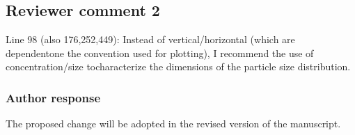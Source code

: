 \documentclass[11pt]{scrartcl}
\providecommand{\DIFadd}[1]{{\protect\textcolor{blue}{\uwave{#1}}}} %
\providecommand{\DIFdel}[1]{{\protect\textcolor{red}{\sout{#1}}}}                      %
\providecommand{\DIFaddbegin}{} %
\providecommand{\DIFaddend}{} %
\providecommand{\DIFdelbegin}{} %
\providecommand{\DIFdelend}{} %
\newenvironment{change}[1][]{%
  \begin{mdframed}[frametitle={Line #1:}]%
}{%
  \end{mdframed}%
}
\begin{document}
\subsection*{Reviewer comment 2}

Line 98 (also 176,252,449): Instead of vertical/horizontal (which are
dependentone the convention used for plotting), I recommend the use of
concentration/size tocharacterize the dimensions of the particle size
distribution.

\subsubsection*{Author response}

The proposed change will be adopted in the revised version of the manuscript.

%
%
%
%
\end{document}
